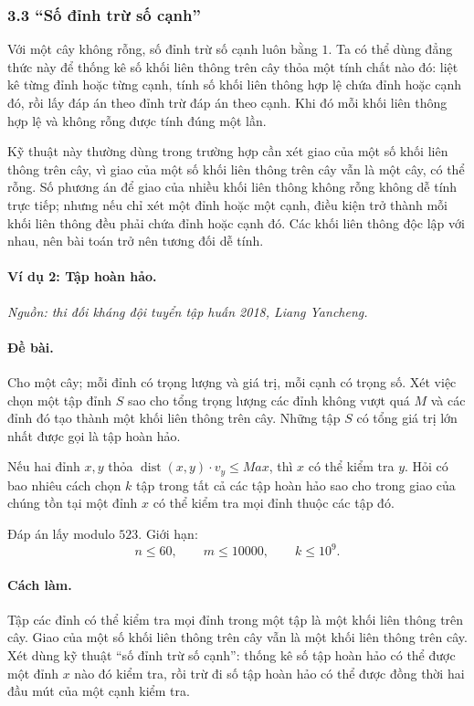 \documentclass[11pt]{article}
\begin{document}
\subsubsection*{3.3 ``Số đỉnh trừ số cạnh''}

Với một cây không rỗng, số đỉnh trừ số cạnh luôn bằng \(1\). Ta có thể dùng đẳng
thức này để thống kê số khối liên thông trên cây thỏa một tính chất nào đó: liệt
kê từng đỉnh hoặc từng cạnh, tính số khối liên thông hợp lệ chứa đỉnh hoặc cạnh
đó, rồi lấy đáp án theo đỉnh trừ đáp án theo cạnh. Khi đó mỗi khối liên thông
hợp lệ và không rỗng được tính đúng một lần.

Kỹ thuật này thường dùng trong trường hợp cần xét giao của một số khối liên
thông trên cây, vì giao của một số khối liên thông trên cây vẫn là một cây, có
thể rỗng. Số phương án để giao của nhiều khối liên thông không rỗng không dễ
tính trực tiếp; nhưng nếu chỉ xét một đỉnh hoặc một cạnh, điều kiện trở thành
mỗi khối liên thông đều phải chứa đỉnh hoặc cạnh đó. Các khối liên thông độc lập
với nhau, nên bài toán trở nên tương đối dễ tính.

\paragraph{Ví dụ 2: Tập hoàn hảo.}
\emph{Nguồn: thi đối kháng đội tuyển tập huấn 2018, Liang Yancheng.}

\paragraph{Đề bài.}
Cho một cây; mỗi đỉnh có trọng lượng và giá trị, mỗi cạnh có trọng số. Xét việc
chọn một tập đỉnh \(S\) sao cho tổng trọng lượng các đỉnh không vượt quá \(M\) và
các đỉnh đó tạo thành một khối liên thông trên cây. Những tập \(S\) có tổng giá
trị lớn nhất được gọi là tập hoàn hảo.

Nếu hai đỉnh \(x,y\) thỏa \(\operatorname{dist}(x,y)\cdot v_y\le Max\), thì
\(x\) có thể kiểm tra \(y\). Hỏi có bao nhiêu cách chọn \(k\) tập trong tất cả
các tập hoàn hảo sao cho trong giao của chúng tồn tại một đỉnh \(x\) có thể kiểm
tra mọi đỉnh thuộc các tập đó.

Đáp án lấy modulo \(523\). Giới hạn:
\[
  n\le 60,\qquad m\le 10000,\qquad k\le 10^9 .
\]

\paragraph{Cách làm.}
Tập các đỉnh có thể kiểm tra mọi đỉnh trong một tập là một khối liên thông trên
cây. Giao của một số khối liên thông trên cây vẫn là một khối liên thông trên
cây. Xét dùng kỹ thuật ``số đỉnh trừ số cạnh'': thống kê số tập hoàn hảo có thể
được một đỉnh \(x\) nào đó kiểm tra, rồi trừ đi số tập hoàn hảo có thể được đồng
thời hai đầu mút của một cạnh kiểm tra.
\end{document}
